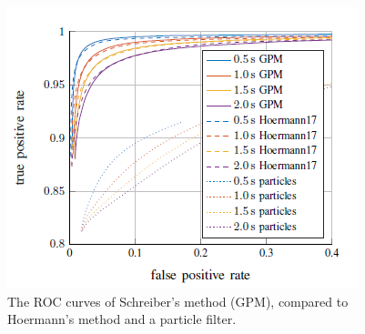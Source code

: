 \begin{figure}[h]
	\centering
	\includegraphics[width=0.5\linewidth]{Figures/Methods/ROC_schreiber}
	\caption{The \gls{ROC} curves of Schreiber's method \cite{schreiber2019long} (GPM), compared to Hoermann's method \cite{hoermann2018dynamic} and a particle filter.}
	\label{fig:roc_schreiber}
\end{figure}

